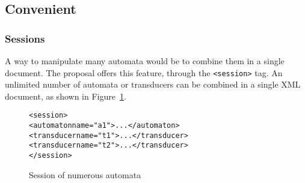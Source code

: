 \documentclass[a4paper]{llncs}
\newcommand{\Vauc}{{\sc Vaucanson}\xspace}
\begin{document}
\subsection{Convenient}

\subsubsection{Sessions}

A way to manipulate many automata would be to combine them in
a single document. The proposal offers this feature, through the
\verb|<session>| tag. An unlimited number of automata or transducers
can be combined in a single XML document, as shown in Figure~\ref{session1}.



{\small

\begin{figure}[h]
  \begin{center}
\begin{alltt}
<session>
  <automaton name="a1">...</automaton>
  <transducer name="t1">...</transducer>
  <transducer name="t2">...</transducer>
</session>
\end{alltt}

\caption{Session of numerous automata}
\label{session1}
  \end{center}
\end{figure}

}








\end{document}
